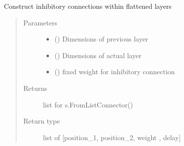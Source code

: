 \documentclass[letterpaper,10pt,english]{sphinxmanual}
\begin{document}

\begin{fulllineitems}
\label{\detokenize{SpikingConvNet:SpikingConvNet.algorithms.rebuild_inhibitory_connections}}
Construct inhibitory connections within flattened layers
\begin{quote}\begin{description}
\item[{Parameters}] \leavevmode\begin{itemize}
\item {} 
 () \textendash{} Dimensions of previous layer

\item {} 
 () \textendash{} Dimensions of actual layer

\item {} 
 () \textendash{} fixed weight for inhibitory connection

\end{itemize}

\item[{Returns}] \leavevmode
{} \textendash{} list for s.FromListConnector()

\item[{Return type}] \leavevmode
list of {[}position\_1, position\_2, weight , delay{]}

\end{description}\end{quote}

\end{fulllineitems}

\end{document}
